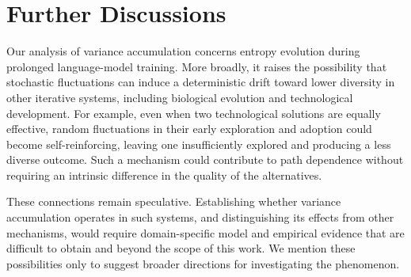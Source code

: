 \section{Further Discussions}
\label{app:further-discussions}

Our analysis of variance accumulation concerns entropy evolution during
prolonged language-model training. More broadly, it raises the possibility
that stochastic fluctuations can induce a deterministic drift toward lower
diversity in other iterative systems, including biological evolution and
technological development. For example, even when two technological
solutions are equally effective, random fluctuations in their early
exploration and adoption could become self-reinforcing, leaving one
insufficiently explored and producing a less diverse outcome. Such a
mechanism could contribute to path dependence without requiring an
intrinsic difference in the quality of the alternatives.

These connections remain speculative. Establishing whether variance
accumulation operates in such systems, and distinguishing its effects
from other mechanisms, would require domain-specific model and empirical
evidence that are difficult to obtain and beyond the scope of this work.
We mention these possibilities only to suggest broader directions for
investigating the phenomenon.
